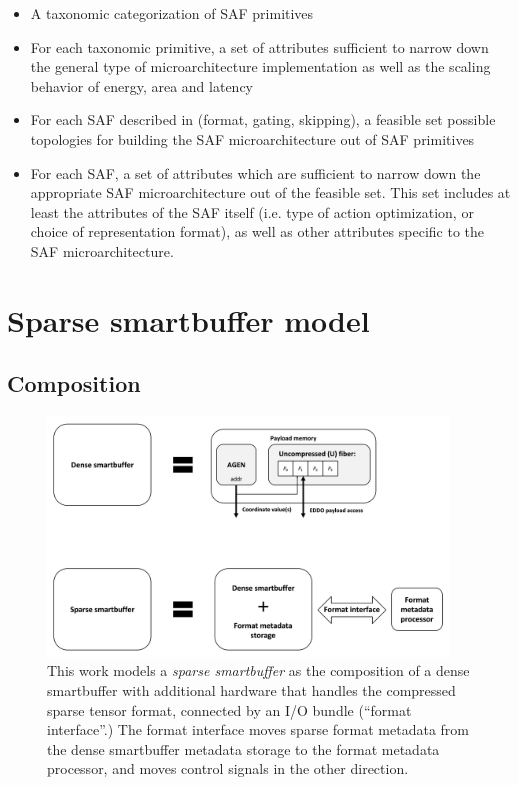 %
\begin{itemize}
    \item A taxonomic categorization of SAF primitives
    \item For each taxonomic primitive, a set of attributes sufficient to narrow down the general type of microarchitecture implementation as well as the scaling behavior of energy, area and latency
    \item For each SAF described in \cite{sparseloop} (format, gating, skipping), a feasible set possible topologies for building the SAF microarchitecture out of SAF primitives
    \item For each SAF, a set of attributes which are sufficient to narrow down the appropriate SAF microarchitecture out of the feasible set. This set includes at least the attributes of the SAF itself (i.e. type of action optimization, or choice of representation format), as well as other attributes specific to the SAF microarchitecture.
\end{itemize}

\section{Sparse smartbuffer model}

\subsection{Composition}

\begin{figure}[ht]
    \centering
    \includegraphics[width=0.95\textwidth]{figures/dense_smartbuffer_composition.png}
    \caption{This work models a \textit{sparse smartbuffer} as the composition of a dense smartbuffer with additional hardware that handles the compressed sparse tensor format, connected by an I/O bundle (``format interface''.) The format interface moves sparse format metadata from the dense smartbuffer metadata storage to the format metadata processor, and moves control signals in the other direction.}
    \label{fig:dense_smartbuffer_composition}
\end{figure}

